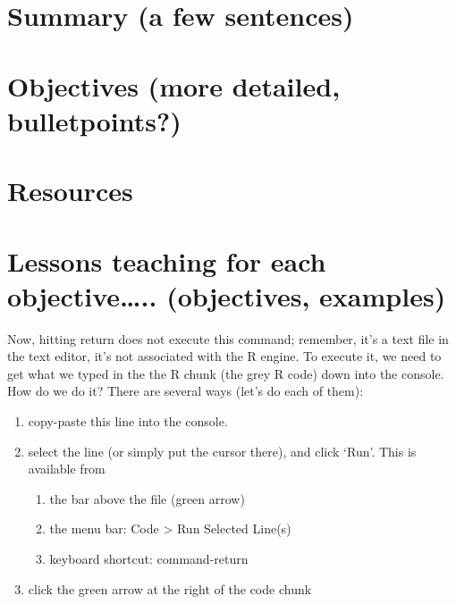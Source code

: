 \documentclass[]{book}
\providecommand{\tightlist}{%
  \setlength{\itemsep}{0pt}\setlength{\parskip}{0pt}}
\begin{document}
\hypertarget{summary-a-few-sentences-1}{%
\section{Summary (a few sentences)}\label{summary-a-few-sentences-1}}

\hypertarget{objectives-more-detailed-bulletpoints-1}{%
\section{Objectives (more detailed, bulletpoints?)}\label{objectives-more-detailed-bulletpoints-1}}

\hypertarget{resources-2}{%
\section{Resources}\label{resources-2}}

\hypertarget{lessons-teaching-for-each-objective..-objectives-examples}{%
\section{Lessons teaching for each objective\ldots{}.. (objectives, examples)}\label{lessons-teaching-for-each-objective..-objectives-examples}}

Now, hitting return does not execute this command; remember, it's a text file in the text editor, it's not associated with the R engine. To execute it, we need to get what we typed in the the R chunk (the grey R code) down into the console. How do we do it? There are several ways (let's do each of them):

\begin{enumerate}
\def\labelenumi{\arabic{enumi}.}
\tightlist
\item
  copy-paste this line into the console.
\item
  select the line (or simply put the cursor there), and click `Run'. This is available from

  \begin{enumerate}
  \def\labelenumii{\alph{enumii}.}
  \tightlist
  \item
    the bar above the file (green arrow)
  \item
    the menu bar: Code \textgreater{} Run Selected Line(s)
  \item
    keyboard shortcut: command-return
  \end{enumerate}
\item
  click the green arrow at the right of the code chunk
\end{enumerate}
\end{document}
